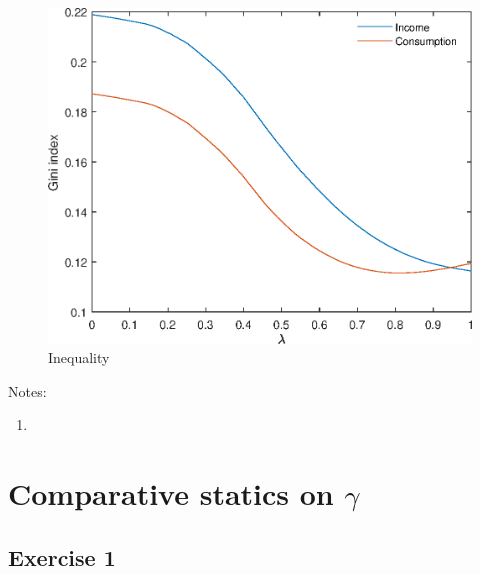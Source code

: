 \documentclass[12pt]{article}
\begin{document}
\begin{figure}
	\centering
	\caption{Inequality}
	\includegraphics{Graphs/ineq_lambda_ex1.eps}
\end{figure}

Notes:

\begin{enumerate}
	\item 
\end{enumerate}

\clearpage

\section{Comparative statics on $\gamma$}

\subsection{Exercise 1}
\end{document}
